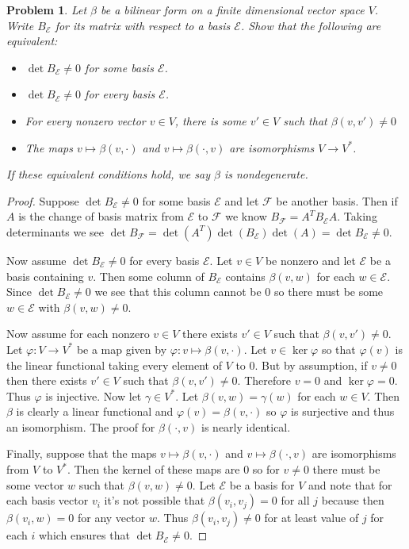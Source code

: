 \documentclass{article}
\newtheorem{problem}{Problem}
\begin{document}
\begin{problem}
Let $\beta$ be a bilinear form on a finite dimensional vector space $V$. Write $B_{\mathcal{E}}$ for its matrix with respect to a basis $\mathcal{E}$. Show that the following are equivalent:
\begin{itemize}
\item $\det B_{\mathcal{E}} \neq 0$ for some basis $\mathcal{E}$.
\item $\det B_{\mathcal{E}} \neq 0$ for every basis $\mathcal{E}$.
\item For every nonzero vector $v \in V$, there is some $v' \in V$ such that $\beta(v,v') \neq 0$
\item The maps $v \mapsto \beta(v, \cdot)$ and $v \mapsto \beta(\cdot , v)$ are isomorphisms $V \to V^*$.
\end{itemize}
If these equivalent conditions hold, we say $\beta$ is \emph{nondegenerate}.
\end{problem}
\begin{proof}
Suppose $\det B_{\mathcal{E}} \neq 0$ for some basis $\mathcal{E}$ and let $\mathcal{F}$ be another basis. Then if $A$ is the change of basis matrix from $\mathcal{E}$ to $\mathcal{F}$ we know $B_{\mathcal{F}} = A^{T} B_{\mathcal{E}} A$. Taking determinants we see $\det B_{\mathcal{F}} = \det (A^T) \det (B_{\mathcal{E}}) \det (A) = \det B_{\mathcal{E}} \neq 0$.

Now assume $\det B_{\mathcal{E}} \neq 0$ for every basis $\mathcal{E}$. Let $v \in V$ be nonzero and let $\mathcal{E}$ be a basis containing $v$. Then some column of $B_{\mathcal{E}}$ contains $\beta(v,w)$ for each $w \in \mathcal{E}$. Since $\det B_{\mathcal{E}} \neq 0$ we see that this column cannot be $0$ so there must be some $w \in \mathcal{E}$ with $\beta(v,w) \neq 0$.

Now assume for each nonzero $v \in V$ there exists $v' \in V$ such that $\beta(v,v') \neq 0$. Let $\varphi : V \to V^*$ be a map given by $\varphi : v \mapsto \beta(v, \cdot)$. Let $v \in \ker \varphi$ so that $\varphi(v)$ is the linear functional taking every element of $V$ to $0$. But by assumption, if $v \neq 0$ then there exists $v' \in V$ such that $\beta(v,v') \neq 0$. Therefore $v = 0$ and $\ker \varphi = 0$. Thus $\varphi$ is injective. Now let $\gamma \in V^*$. Let $\beta(v,w) = \gamma(w)$ for each $w \in V$. Then $\beta$ is clearly a linear functional and $\varphi(v) = \beta(v, \cdot)$ so $\varphi$ is surjective and thus an isomorphism. The proof for $\beta(\cdot, v)$ is nearly identical.

Finally, suppose that the maps $v \mapsto \beta(v, \cdot)$ and $v \mapsto \beta(\cdot, v)$ are isomorphisms from $V$ to $V^*$. Then the kernel of these maps are $0$ so for $v \neq 0$ there must be some vector $w$ such that $\beta(v,w) \neq 0$. Let $\mathcal{E}$ be a basis for $V$ and note that for each basis vector $v_i$ it's not possible that $\beta(v_i,v_j) = 0$ for all $j$ because then $\beta(v_i,w) = 0$ for any vector $w$. Thus $\beta(v_i,v_j) \neq 0$ for at least value of $j$ for each $i$ which ensures that $\det B_{\mathcal{E}} \neq 0$.
\end{proof}
\end{document}
